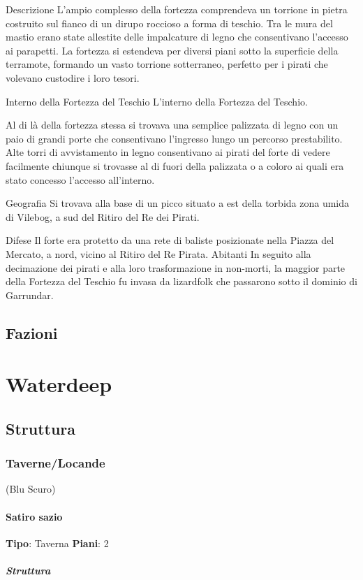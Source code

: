 \documentclass{article}
\begin{document}
Descrizione
L'ampio complesso della fortezza comprendeva un torrione in pietra costruito sul fianco di un dirupo roccioso a forma di teschio. Tra le mura del mastio erano state allestite delle impalcature di legno che consentivano l'accesso ai parapetti. La fortezza si estendeva per diversi piani sotto la superficie della terramote, formando un vasto torrione sotterraneo, perfetto per i pirati che volevano custodire i loro tesori.

Interno della Fortezza del Teschio
L'interno della Fortezza del Teschio.

Al di là della fortezza stessa si trovava una semplice palizzata di legno con un paio di grandi porte che consentivano l'ingresso lungo un percorso prestabilito. Alte torri di avvistamento in legno consentivano ai pirati del forte di vedere facilmente chiunque si trovasse al di fuori della palizzata o a coloro ai quali era stato concesso l'accesso all'interno.

Geografia
Si trovava alla base di un picco situato a est della torbida zona umida di Vilebog, a sud del Ritiro del Re dei Pirati.

Difese
Il forte era protetto da una rete di baliste posizionate nella Piazza del Mercato, a nord, vicino al Ritiro del Re Pirata.
Abitanti
In seguito alla decimazione dei pirati e alla loro trasformazione in non-morti, la maggior parte della Fortezza del Teschio fu invasa da lizardfolk che passarono sotto il dominio di Garrundar.
\subsection{Fazioni}

\section{Waterdeep}
\subsection{Struttura}
\subsubsection{Taverne/Locande} (Blu Scuro)
\paragraph{Satiro sazio}
\textbf{Tipo}: Taverna
\textbf{Piani}: 2\newline
\subparagraph{Struttura}
\end{document}

